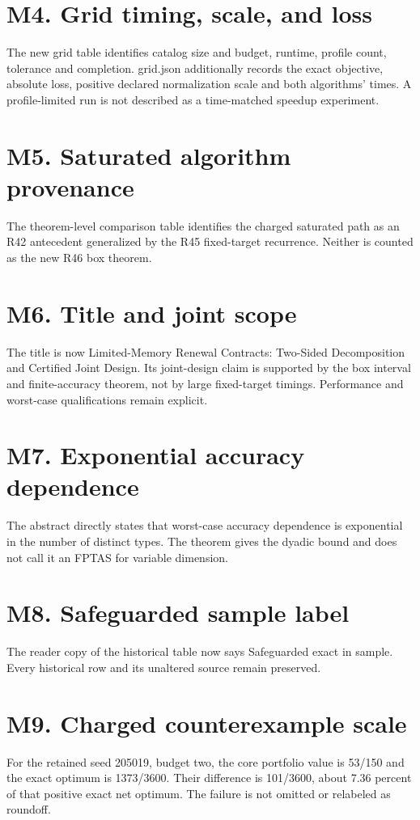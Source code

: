 \documentclass[11pt,letterpaper]{article}
\begin{document}
\section*{M4. Grid timing, scale, and loss}
The new grid table identifies catalog size and budget, runtime, profile count, tolerance and completion. grid.json additionally records the exact objective, absolute loss, positive declared normalization scale and both algorithms' times. A profile-limited run is not described as a time-matched speedup experiment.

\section*{M5. Saturated algorithm provenance}
The theorem-level comparison table identifies the charged saturated path as an R42 antecedent generalized by the R45 fixed-target recurrence. Neither is counted as the new R46 box theorem.

\section*{M6. Title and joint scope}
The title is now Limited-Memory Renewal Contracts: Two-Sided Decomposition and Certified Joint Design. Its joint-design claim is supported by the box interval and finite-accuracy theorem, not by large fixed-target timings. Performance and worst-case qualifications remain explicit.

\section*{M7. Exponential accuracy dependence}
The abstract directly states that worst-case accuracy dependence is exponential in the number of distinct types. The theorem gives the dyadic bound and does not call it an FPTAS for variable dimension.

\section*{M8. Safeguarded sample label}
The reader copy of the historical table now says Safeguarded exact in sample. Every historical row and its unaltered source remain preserved.

\section*{M9. Charged counterexample scale}
For the retained seed 205019, budget two, the core portfolio value is 53/150 and the exact optimum is 1373/3600. Their difference is 101/3600, about 7.36 percent of that positive exact net optimum. The failure is not omitted or relabeled as roundoff.
\end{document}
